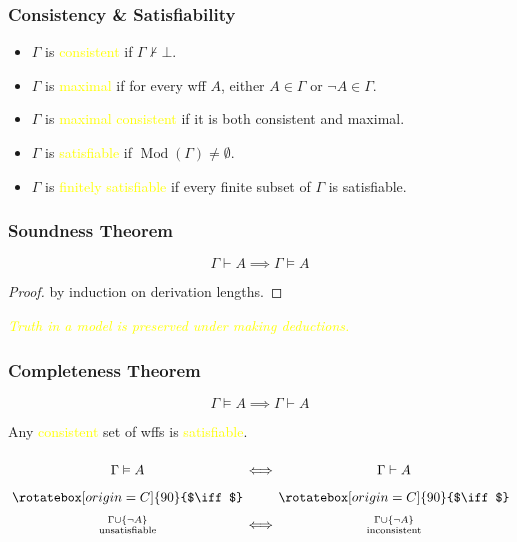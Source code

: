 \documentclass[UTF8,aspectratio=43,11pt,colorlinks,compress,openany]{beamer}%
\begin{document}
\begin{frame}\frametitle{Consistency \& Satisfiability}
	\begin{itemize}
		\item $\Gamma$ is \textcolor{yellow}{consistent} if $\Gamma\nvdash\bot$.
		\item $\Gamma$ is \textcolor{yellow}{maximal} if for every wff $A$, either $A\in\Gamma$ or $\neg A\in\Gamma$.
		\item $\Gamma$ is \textcolor{yellow}{maximal consistent} if it is both consistent and maximal.
	\end{itemize}
	\begin{itemize}
		\item $\Gamma$ is \textcolor{yellow}{satisfiable} if $\operatorname{Mod}(\Gamma)\neq\emptyset$.
		\item $\Gamma$ is \textcolor{yellow}{finitely satisfiable} if every finite subset of $\Gamma$ is satisfiable.
	\end{itemize}
\end{frame}

\begin{frame}\frametitle{Soundness Theorem}
	\begin{theorem}
		\[\Gamma\vdash A\implies\Gamma\vDash A\]
	\end{theorem}
	\begin{proof}
		by induction on derivation lengths.
	\end{proof}
	\centering \emph{\textcolor{yellow}{Truth in a model is preserved under making deductions.}}
\end{frame}

\begin{frame}\frametitle{Completeness Theorem}
		\begin{theorem}
			\[\Gamma\vDash A\implies\Gamma\vdash A\]
		\end{theorem}
		\begin{corollary}
			Any \textcolor{yellow}{consistent} set of wffs is \textcolor{yellow}{satisfiable}.
		\end{corollary}\vspace*{-3ex}
		{\Large \[\arraycolsep=0.7pt\def\arraystretch{1.7}
			\begin{array}{cccc}
			&\Gamma\vDash A&\iff&\Gamma\vdash A\\
			&\rotatebox[origin=C]{90}{$\iff$}&&\rotatebox[origin=C]{90}{$\iff$}\\
			&\Gamma\cup\{\neg A\}\atop{\text{unsatisfiable}}&\iff&\Gamma\cup\{\neg A\}\atop{\text{inconsistent}}
			\end{array}
			\]}
\end{frame}
\end{document}

